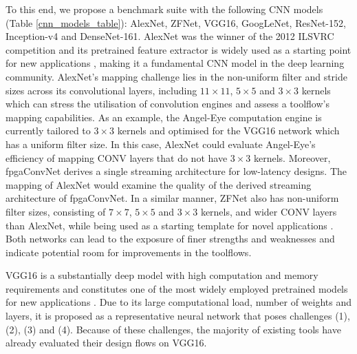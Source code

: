 \documentclass[format=acmsmall, review=false, screen=true]{acmart}
\begin{document}
To this end, we propose a benchmark suite with the following CNN models (Table \ref{cnn_models_table}): AlexNet, ZFNet, VGG16, GoogLeNet, ResNet-152, Inception-v4 and {\color{black}DenseNet-161}. AlexNet was the winner of the 2012 ILSVRC competition and its pretrained feature extractor is widely used as a starting point for new applications \cite{Redmon_2015}, making it a fundamental CNN model in the deep learning community. AlexNet's mapping challenge lies in the non-uniform filter and stride sizes across its convolutional layers, including $11 \times 11$, $5 \times 5$ and $3 \times 3$ kernels which can stress the utilisation of convolution engines and assess a toolflow's mapping capabilities. As an example, the Angel-Eye computation engine is currently tailored to $3 \times 3$ kernels and optimised for the VGG16 network which has a uniform filter size. In this case, AlexNet could evaluate Angel-Eye's efficiency of mapping CONV layers that do not have $3 \times 3$ kernels. Moreover, fpgaConvNet derives a single streaming architecture for low-latency designs. The mapping of AlexNet would examine the quality of the derived streaming architecture of fpgaConvNet. In a similar manner, ZFNet also has non-uniform filter sizes, consisting of $7 \times 7$, $5 \times 5$ and $3 \times 3$ kernels, and wider CONV layers than AlexNet, while being used as a starting template for novel applications \cite{Ren_2017}. Both networks can lead to the exposure of finer strengths and weaknesses and indicate potential room for improvements in the toolflows.

VGG16 is a substantially deep model with high computation and memory requirements and constitutes one of the most widely employed pretrained models for new applications \cite{Badrinarayanan_2017}. Due to its large computational load, number of weights and layers, it is proposed as a representative neural network that poses challenges (1), (2), (3) and (4). Because of these challenges, the majority of existing tools have already evaluated their design flows on VGG16.
\end{document}
